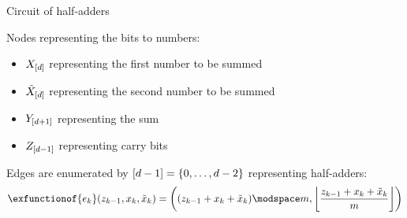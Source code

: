\documentclass{beamer}
\begin{document}
    \begin{frame}{Circuit of half-adders}

        Nodes representing the bits to numbers:
        \begin{itemize}
            \item $X_{[d]}$ representing the first number to be summed
            \item $\tilde{X}_{[d]}$ representing the second number to be summed
            \item $Y_{[d+1]}$ representing the sum
            \item $Z_{[d-1]}$ representing carry bits
        \end{itemize}

        Edges are enumerated by $[d-1]=\{0,\ldots,d-2\}$ representing half-adders:
        \begin{align*}
            \exfunctionof{\edgeof{\catenumerator}}(\thirdcatindexof{\catenumerator-1},\catindexof{\catenumerator},\tildecatindexof{\catenumerator})
            = \left(
                  (\thirdcatindexof{\catenumerator-1} + \catindexof{\catenumerator} + \tildecatindexof{\catenumerator}) \modspace\catdim,
                  \left\lfloor\frac{\thirdcatindexof{\catenumerator-1} + \catindexof{\catenumerator} + \tildecatindexof{\catenumerator}}{\catdim}\right\rfloor
            \right)
        \end{align*}

        

    \end{frame}
\end{document}
